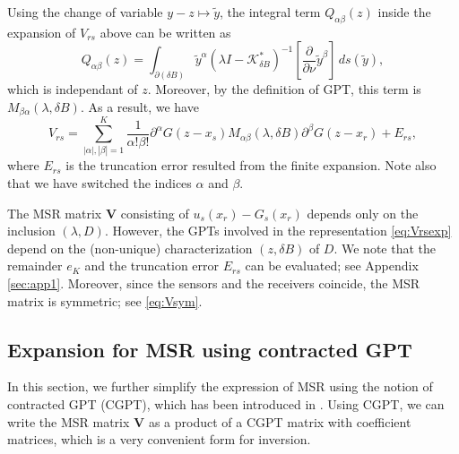 Using the change of variable $y - z \mapsto \tilde{y}$, the
integral term $Q_{\alpha\beta}(z)$ inside the expansion of
$V_{rs}$ above can be written as
\begin{equation}
Q_{\alpha\beta}(z) = \int_{\partial (\delta B)} \tilde{y}^\alpha
(\lambda I - \mathcal{K}_{\delta
B}^*)^{-1}[\frac{\partial}{\partial \nu} \tilde{y}^\beta]\,
ds(\tilde{y}),
\end{equation}
which is independant of $z$. Moreover, by the definition of GPT,
this term is $M_{ \beta \alpha}(\lambda, \delta B)$. As a result,
we have\begin{equation} V_{rs} = \sum_{|\alpha|,|\beta|=1}^K
\frac{1}{\alpha ! \beta !}
\partial^\alpha G(z-x_s) M_{\alpha \beta}(\lambda, \delta B)
\partial^\beta G(z-x_r) + E_{rs}, \label{eq:Vrsexp}
\end{equation}
where $E_{rs}$ is the truncation error resulted from the finite
expansion. Note also that we have switched the indices $\alpha$
and $\beta$.

The MSR matrix $\mathbf{V}$ consisting of $u_s(x_r) -
G_s(x_r)$ depends only on the inclusion $(\lambda,D)$.
However, the GPTs involved in the representation \eqref{eq:Vrsexp}
depend on the (non-unique) characterization $(z, \delta B)$ of
$D$. We note that the remainder $e_K$ and the truncation error
$E_{rs}$ can be evaluated; see Appendix \ref{sec:app1}. Moreover,
since the sensors and the receivers coincide, the MSR matrix is
symmetric; see \eqref{eq:Vsym}.

\subsection{Expansion for MSR using contracted GPT}

In this section, we further simplify the expression of MSR using
the notion of contracted GPT (CGPT), which has been introduced in
\cite{AKLL11}. Using CGPT, we can write the MSR matrix
$\mathbf{V}$ as a product of  a CGPT matrix with coefficient
matrices, which is a very convenient form for inversion.

